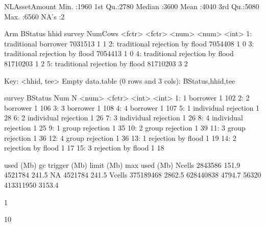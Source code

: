 \begin{Schunk}
\begin{Soutput}
 NLAssetAmount 
 Min.   :1960  
 1st Qu.:2780  
 Median :3600  
 Mean   :4040  
 3rd Qu.:5080  
 Max.   :6560  
 NA's   :2     
\end{Soutput}
\begin{Soutput}
           Arm            BStatus     hhid survey NumCows
        <fctr>             <fctr>    <num>  <num>   <int>
1: traditional           borrower  7031513      1       1
2: traditional rejection by flood  7054408      1       0
3: traditional rejection by flood  7054413      1       0
4: traditional rejection by flood 81710203      1       2
5: traditional rejection by flood 81710203      3       2
\end{Soutput}
\begin{Soutput}
Key: <hhid, tee>
Empty data.table (0 rows and 3 cols): BStatus,hhid,tee
\end{Soutput}
\begin{Soutput}
    survey              BStatus   Num     N
     <num>               <fctr> <int> <int>
 1:      1             borrower     1   102
 2:      2             borrower     1   106
 3:      3             borrower     1   108
 4:      4             borrower     1   107
 5:      1 individual rejection     1    28
 6:      2 individual rejection     1    26
 7:      3 individual rejection     1    26
 8:      4 individual rejection     1    25
 9:      1      group rejection     1    35
10:      2      group rejection     1    39
11:      3      group rejection     1    36
12:      4      group rejection     1    36
13:      1   rejection by flood     1    19
14:      2   rejection by flood     1    17
15:      3   rejection by flood     1    18
\end{Soutput}
\begin{Soutput}
            used   (Mb) gc trigger   (Mb) limit (Mb)  max used   (Mb)
Ncells   2843586  151.9    4521784  241.5         NA   4521784  241.5
Vcells 375189468 2862.5  628440838 4794.7      56320 413311950 3153.4
\end{Soutput}
\begin{Soutput}
[1] 1
\end{Soutput}
\begin{Soutput}
[1] 10
\end{Soutput}
\begin{Soutput}
Warning in rbind(c("", "&", rbind(paste0("\\makebox[", hcenter, unit, "]{", : number of columns of result is not a multiple of vector length (arg 1)
\end{Soutput}
\begin{Soutput}
Warning in rbind(c("", "&", rbind(paste0("\\makebox[", hcenter, unit, "]{", : number of columns of result is not a multiple of vector length (arg 1)
\end{Soutput}
\begin{Soutput}
Warning in rbind(c("", "&", rbind(paste0("\\makebox[", hcenter, unit, "]{", : number of columns of result is not a multiple of vector length (arg 1)
\end{Soutput}
\end{Schunk}

